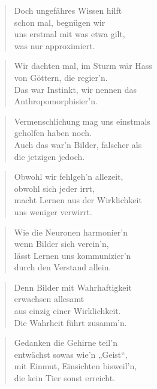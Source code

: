 \documentclass[10pt,a4paper]{article}
\begin{document}
\begin{paracol}{2}
\begin{verse}
Doch ungefähres Wissen hilft \\
schon mal, begnügen wir \\
uns erstmal mit was etwa gilt, \\
was nur approximiert. \\
\end{verse}

\begin{verse}
Wir dachten mal, im Sturm wär Hass \\
von Göttern, die regier’n. \\
Das war Instinkt, wir nennen das \\
Anthropomorphisier’n. \\
\end{verse}

\begin{verse}
Vermenschlichung mag uns einstmals \\
geholfen haben noch. \\
Auch das war’n Bilder, falscher als \\
die jetzigen jedoch. \\
\end{verse}

\begin{verse}
Obwohl wir fehlgeh’n allezeit, \\
obwohl sich jeder irrt, \\
macht Lernen aus der Wirklichkeit \\
uns weniger verwirrt. \\
\end{verse}

\begin{verse}
Wie die Neuronen harmonier’n \\
wenn Bilder sich verein’n, \\
lässt Lernen uns kommunizier’n \\
durch den Verstand allein. \\
\end{verse}

\begin{verse}
Denn Bilder mit Wahrhaftigkeit \\
erwachsen allesamt \\
aus einzig einer Wirklichkeit. \\
Die Wahrheit führt zusamm’n. \\
\end{verse}

\begin{verse}
Gedanken die Gehirne teil’n \\
entwächst sowas wie’n „Geist“, \\
mit Einmut, Einsichten bisweil’n, \\
die kein Tier sonst erreicht. \\
\end{verse}


\end{paracol}
\end{document}
